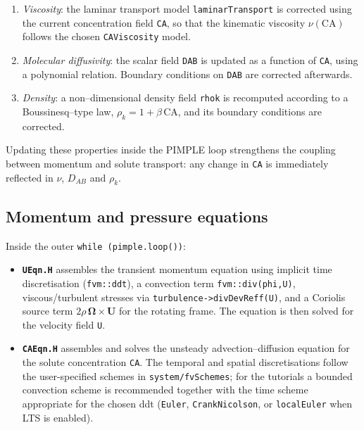 \documentclass[11pt,a4paper]{article}
\begin{document}
\begin{enumerate}
	\item \emph{Viscosity}: the laminar transport model
	\texttt{laminarTransport} is corrected using the current
	concentration field \texttt{CA}, so that the kinematic viscosity
	\(\nu(\mathrm{CA})\) follows the chosen \texttt{CAViscosity}
	model.
	
	\item \emph{Molecular diffusivity}: the scalar field \texttt{DAB} is
	updated as a function of \texttt{CA}, using a polynomial
	relation. Boundary conditions on \texttt{DAB} are corrected
	afterwards.
	
	\item \emph{Density}: a non--dimensional density field \texttt{rhok}
	is recomputed according to a Boussinesq--type law,
	\(\rho_k = 1 + \beta\,\mathrm{CA}\), and its boundary
	conditions are corrected.
\end{enumerate}

Updating these properties inside the PIMPLE loop strengthens the
coupling between momentum and solute transport: any change in
\texttt{CA} is immediately reflected in \(\nu\), \(D_{AB}\) and
\(\rho_k\).

\subsection{Momentum and pressure equations}

Inside the outer \texttt{while (pimple.loop())}:

\begin{itemize}
	\item \textbf{\texttt{UEqn.H}} assembles the transient momentum
	equation using implicit time discretisation
	(\texttt{fvm::ddt}), a convection term
	\texttt{fvm::div(phi,U)}, viscous/turbulent stresses via
	\texttt{turbulence->divDevReff(U)}, and a Coriolis source term
	\(2\rho\,\boldsymbol{\Omega}\times\mathbf{U}\) for the rotating
	frame. The equation is then solved for the velocity field
	\texttt{U}.
	
	\item \textbf{\texttt{CAEqn.H}} assembles and solves the unsteady
	advection--diffusion equation for the solute concentration
	\texttt{CA}. The temporal and spatial discretisations follow
	the user-specified schemes in \texttt{system/fvSchemes}; for the
	tutorials a bounded convection scheme is recommended together
	with the time scheme appropriate for the chosen ddt
	(\texttt{Euler}, \texttt{CrankNicolson}, or \texttt{localEuler}
	when LTS is enabled).
\end{itemize}
\end{document}
